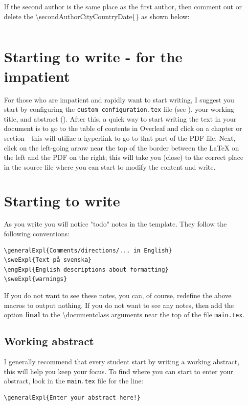 \documentclass[main.tex]{subfiles}
\begin{document}
If the second author is the same place as the first author, then comment out or delete the \textbackslash secondAuthorCityCountryDate\{\} as shown below:
\begin{lstlisting}[style=latexExampleForAuthors]
%\secondAuthorCityCountryDate{}
\end{lstlisting}

\section{Starting to write - for the impatient}
\label{sec:writingForTheImpatient}
For those who are impatient and rapidly want to start writing, I suggest you start by configuring the \texttt{custom\_configuration.tex} file (see ), your working title, and abstract (). After this, a quick way to start writing the text in your document is to go to the table of contents in Overleaf and click on a chapter or section - this will utilize a hyperlink to go to that part of the PDF file. Next, click on the left-going arrow near the top of the border between the LaTeX on the left and the PDF on the right; this will take you (close) to the correct place in the source file where you can start to modify the content and write.

\section{Starting to write}
\label{sec:startingToWrite}


As you write you will notice "todo" notes in the template. They follow the following conventions:
\begin{lstlisting}[style=latexExampleForAuthors]
\generalExpl{Comments/directions/... in English}
\sweExpl{Text på svenska}
\engExpl{English descriptions about formatting}
\sweExpl{warnings}
\end{lstlisting}

If you do not want to see these notes, you can, of course, redefine the above macros to output nothing. If you do not want to see any notes, then add the option \textbf{final} to the \textbackslash documentclass arguments near the top of the file \texttt{main.tex}.

\subsection{Working abstract}
\label{sec:wrtingFirstAbstract}
I generally recommend that every student start by writing a working abstract, this will help you keep your focus. To find where you can start to enter your abstract, look in the \texttt{main.tex} file for the line:
\begin{lstlisting}[style=latexExampleForAuthors]
\generalExpl{Enter your abstract here!}
\end{lstlisting}
\end{document}
